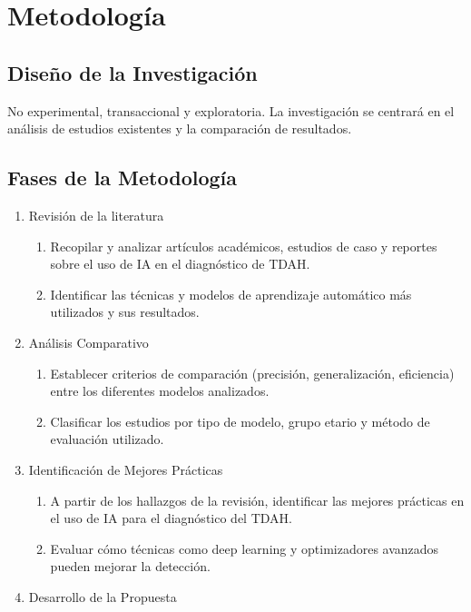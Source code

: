 \documentclass[10pt,journal,compsoc]{IEEEtran}
\begin{document}
\section{Metodología}

\subsection{Diseño de la Investigación}
No experimental, transaccional y exploratoria. La investigación se centrará en el análisis de estudios existentes y la comparación de resultados.

\subsection{Fases de la Metodología}
\begin{enumerate}
    \item Revisión de la literatura
          \begin{enumerate}
              \item Recopilar y analizar artículos académicos, estudios de caso y reportes sobre el uso de IA en el diagnóstico de TDAH.
              \item Identificar las técnicas y modelos de aprendizaje automático más utilizados y sus resultados.
          \end{enumerate}
    \item Análisis Comparativo
          \begin{enumerate}
              \item Establecer criterios de comparación (precisión, generalización, eficiencia) entre los diferentes modelos analizados.
              \item Clasificar los estudios por tipo de modelo, grupo etario y método de evaluación utilizado.
          \end{enumerate}
    \item Identificación de Mejores Prácticas
          \begin{enumerate}
              \item A partir de los hallazgos de la revisión, identificar las mejores prácticas en el uso de IA para el diagnóstico del TDAH.
              \item Evaluar cómo técnicas como deep learning y optimizadores avanzados pueden mejorar la detección.
          \end{enumerate}
    \item Desarrollo de la Propuesta
          \begin{enumerate}

\end{enumerate}
\end{enumerate}
\end{document}
